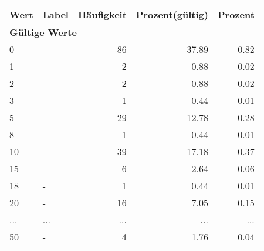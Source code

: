      \begin{longtable}{lXrrr}
     \toprule
     \textbf{Wert} & \textbf{Label} & \textbf{Häufigkeit} & \textbf{Prozent(gültig)} & \textbf{Prozent} \\
     \endhead
     \midrule
     \multicolumn{5}{l}{\textbf{Gültige Werte}}\\
        0 & \multicolumn{1}{X}{-} & %
          \num{86} &
          \num[round-mode=places,round-precision=2]{37,89} &
          \num[round-mode=places,round-precision=2]{0,82} \\
        1 & \multicolumn{1}{X}{-} & %
          \num{2} &
          \num[round-mode=places,round-precision=2]{0,88} &
          \num[round-mode=places,round-precision=2]{0,02} \\
        2 & \multicolumn{1}{X}{-} & %
          \num{2} &
          \num[round-mode=places,round-precision=2]{0,88} &
          \num[round-mode=places,round-precision=2]{0,02} \\
        3 & \multicolumn{1}{X}{-} & %
          \num{1} &
          \num[round-mode=places,round-precision=2]{0,44} &
          \num[round-mode=places,round-precision=2]{0,01} \\
        5 & \multicolumn{1}{X}{-} & %
          \num{29} &
          \num[round-mode=places,round-precision=2]{12,78} &
          \num[round-mode=places,round-precision=2]{0,28} \\
        8 & \multicolumn{1}{X}{-} & %
          \num{1} &
          \num[round-mode=places,round-precision=2]{0,44} &
          \num[round-mode=places,round-precision=2]{0,01} \\
        10 & \multicolumn{1}{X}{-} & %
          \num{39} &
          \num[round-mode=places,round-precision=2]{17,18} &
          \num[round-mode=places,round-precision=2]{0,37} \\
        15 & \multicolumn{1}{X}{-} & %
          \num{6} &
          \num[round-mode=places,round-precision=2]{2,64} &
          \num[round-mode=places,round-precision=2]{0,06} \\
        18 & \multicolumn{1}{X}{-} & %
          \num{1} &
          \num[round-mode=places,round-precision=2]{0,44} &
          \num[round-mode=places,round-precision=2]{0,01} \\
        20 & \multicolumn{1}{X}{-} & %
          \num{16} &
          \num[round-mode=places,round-precision=2]{7,05} &
          \num[round-mode=places,round-precision=2]{0,15} \\
       ... & ... & ... & ... & ... \\
        50 & \multicolumn{1}{X}{-} & %
          \num{4} &
          \num[round-mode=places,round-precision=2]{1,76} &
          \num[round-mode=places,round-precision=2]{0,04} \\


\end{longtable}
